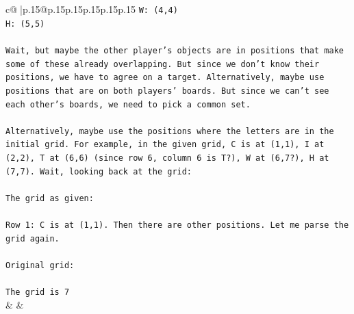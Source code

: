 \documentclass{article}
\begin{document}
{\begin{supertabular}{c@{$\;$}|p{.15\linewidth}@{}p{.15\linewidth}p{.15\linewidth}p{.15\linewidth}p{.15\linewidth}p{.15\linewidth}}
{{{\texttt{W: (4,4)} \\
\texttt{H: (5,5)} \\
\\ 
\texttt{Wait, but maybe the other player's objects are in positions that make some of these already overlapping. But since we don't know their positions, we have to agree on a target. Alternatively, maybe use positions that are on both players' boards. But since we can't see each other's boards, we need to pick a common set.} \\
\\ 
\texttt{Alternatively, maybe use the positions where the letters are in the initial grid. For example, in the given grid, C is at (1,1), I at (2,2), T at (6,6) (since row 6, column 6 is T?), W at (6,7?), H at (7,7). Wait, looking back at the grid:} \\
\\ 
\texttt{The grid as given:} \\
\\ 
\texttt{Row 1: C is at (1,1). Then there are other positions. Let me parse the grid again.} \\
\\ 
\texttt{Original grid:} \\
\\ 
\texttt{The grid is 7} \\
            }
        }
    }
    & & \\ \\


\end{supertabular}}
\end{document}
